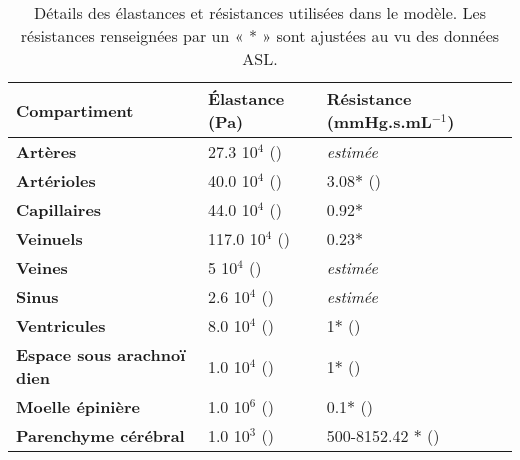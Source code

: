 \begin {table}
	\caption{Détails des élastances et résistances utilisées dans le modèle. Les résistances renseignées par un « * » sont
ajustées au vu des données ASL.} 
	\label{tab:elastances} 
	\centering
	\begin{tabularx}{\linewidth}{  X | X | X }

	{\bf Compartiment}  & { \bf \'Elastance (Pa)} & {\bf Résistance (mmHg.s.mL$^{-1}$)} \\
\hline
	{\bf Artères} & 27.3 10$^4$ (\cite{Zagzoule1986}) & {\em estimée}\\
{\bf Artérioles} & 40.0 10$^4$ (\cite{Zagzoule1986}) & 3.08$\ast$ (\cite{Linninger2009}) \\
{\bf Capillaires} & 44.0 10$^4$ (\cite{Zagzoule1986}) & 0.92$\ast$ \\
{\bf Veinuels} & 117.0 10$^4$ (\cite{Zagzoule1986}) & 0.23$\ast$ \\
{\bf Veines} & 5 10$^4$ (\cite{Zagzoule1986}) & {\em estimée}\\
{\bf Sinus} & 2.6 10$^4$ (\cite{Zagzoule1986}) & {\em estimée}\\
{\bf Ventricules} & 8.0 10$^4$ (\cite{Smillie2004}) & 1$\ast$ (\cite{Linninger2009}) \\
{\bf Espace sous arachno\"i dien} & 1.0 10$^4$ (\cite{Zagzoule1986}) & 1$\ast$ (\cite{Linninger2009}) \\
{\bf Moelle épinière} & 1.0 10$^6$ (\cite{Smillie2004}) & 0.1$\ast$ (\cite{Linninger2009}) \\
{\bf Parenchyme cérébral} & 1.0 10$^3$ (\cite{Smillie2004}) & 500-8152.42 $\ast$ (\cite{Linninger2009}) \\
	\end{tabularx}
\end{table}





